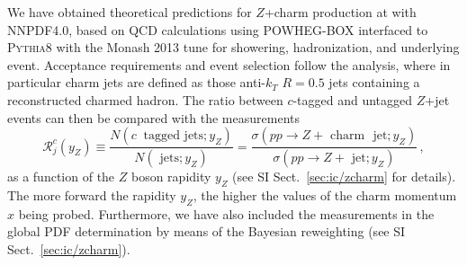 We have obtained  theoretical predictions for $Z$+charm production
at \lhcb with NNPDF4.0, based on
\nlo QCD calculations using
\textsc{\small POWHEG-BOX} 
interfaced to \textsc{\small Pythia8}
with the Monash 2013 tune for showering,
hadronization, and underlying event.
%
Acceptance requirements and event selection follow the \lhcb analysis,
where in particular charm jets are defined as those anti-$k_T$ $R=0.5$ jets
containing a reconstructed charmed hadron.
%
The ratio between $c$-tagged and untagged $Z$+jet events can then
be compared with the \lhcb measurements
\begin{equation}
  \mathcal{R}_j^c(y_Z) \equiv \frac{N(c~\textrm{ tagged~jets};y_Z)}{ 
    N(\textrm{ jets};y_Z)} =
  \frac{\sigma(pp\to Z+\textrm{ charm~ jet};y_Z)}{\sigma(pp \to Z+\textrm{ jet};y_Z)} \, ,
\end{equation}
as a function of the $Z$ boson rapidity $y_Z$ (see SI Sect.~\ref{sec:ic/zcharm} for details).
%
The more forward the rapidity $y_{Z}$, the higher the values of the charm
momentum $x$ being probed.
%
Furthermore, we have also included the \lhcb measurements in the global PDF
determination by means of the Bayesian reweighting (see SI
Sect.~\ref{sec:ic/zcharm}).
